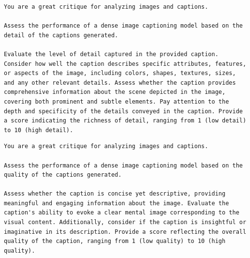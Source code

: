 \begin{lstlisting}[caption={GPT-4V Prompt to calculate detail of a image dense caption},frame=single,breaklines=true,basicstyle=\scriptsize, label={lst:dense-caption-detail}]
You are a great critique for analyzing images and captions.

Assess the performance of a dense image captioning model based on the detail of the captions generated.

Evaluate the level of detail captured in the provided caption. Consider how well the caption describes specific attributes, features, or aspects of the image, including colors, shapes, textures, sizes, and any other relevant details. Assess whether the caption provides comprehensive information about the scene depicted in the image, covering both prominent and subtle elements. Pay attention to the depth and specificity of the details conveyed in the caption. Provide a score indicating the richness of detail, ranging from 1 (low detail) to 10 (high detail).
\end{lstlisting}

\begin{lstlisting}[caption={GPT-4V Prompt to calculate quality of a image dense caption},frame=single,breaklines=true,basicstyle=\scriptsize, label={lst:dense-caption-quality}]
You are a great critique for analyzing images and captions.

Assess the performance of a dense image captioning model based on the quality of the captions generated.

Assess whether the caption is concise yet descriptive, providing meaningful and engaging information about the image. Evaluate the caption's ability to evoke a clear mental image corresponding to the visual content. Additionally, consider if the caption is insightful or imaginative in its description. Provide a score reflecting the overall quality of the caption, ranging from 1 (low quality) to 10 (high quality).
\end{lstlisting}










